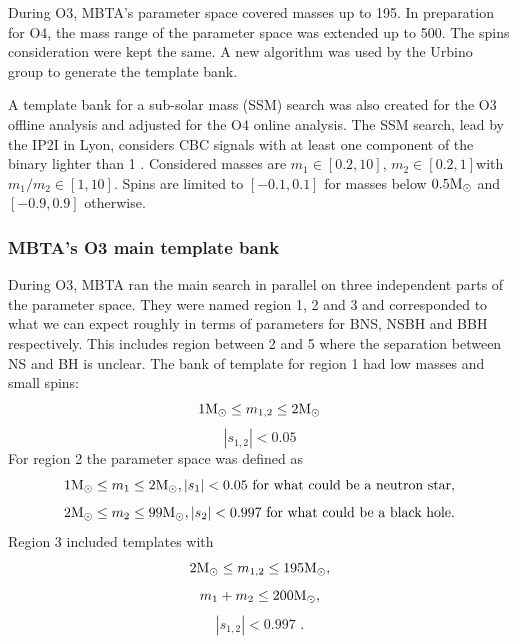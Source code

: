 During O3, MBTA's parameter space covered masses up to \SI{195}{\msun}.
In preparation for O4, the mass range of the parameter space was extended up to \SI{500}{\msun}.
The spins consideration were kept the same.
A new algorithm was used by the Urbino group to generate the template bank. 

A template bank for a sub-solar mass (SSM) search was also created for the O3 offline analysis and adjusted for the O4 online analysis.
The SSM search, lead by the IP2I in Lyon, considers CBC signals with at least one component of the binary lighter than 1 \msun.
Considered masses are $m_1 \in \left[ 0.2, 10 \right]$\msun, $m_2 \in \left[ 0.2, 1 \right]$\msun with $m_1/m_2 \in \left[ 1,10 \right]$\msun.
Spins are limited to $\left[ -0.1,0.1 \right]$ for masses below $0.5\textrm{M$_{\odot}$}$ and $\left[ -0.9,0.9 \right]$ otherwise.



\subsubsection{MBTA's O3 main template bank}
\label{sec:bankO3}

During O3, MBTA ran the main search in parallel on three independent parts of the parameter space.
They were named region 1, 2 and 3 and corresponded to what we can expect roughly in terms of parameters for BNS, NSBH and BBH respectively.
This includes region between 2 and 5 \msun where the separation between NS and BH is unclear.
The bank of template for region 1 had low masses and small spins: $$1 \textrm{M$_{\odot}$} \leq m_{1,2} \leq 2 \textrm{M$_{\odot}$}$$  $$|s_{1,2}|<0.05$$
For region 2 the parameter space was defined as $$1 \textrm{M$_{\odot}$} \leq m_{1} \leq 2 \textrm{M$_{\odot}$}, |s_{1}|<0.05 \textrm{ for what could be a neutron star,}$$  $$2 \textrm{M$_{\odot}$} \leq m_{2} \leq 99 \textrm{M$_{\odot}$}, |s_{2}|<0.997 \textrm{ for what could be a black hole.}$$
Region 3 included templates with $$2 \textrm{M$_{\odot}$} \leq m_{1,2} \leq 195 \textrm{M$_{\odot}$},$$ $$m_1+m_2 \leq 200 \textrm{M$_{\odot}$},$$ $$|s_{1,2}|<0.997\text{ .}$$

